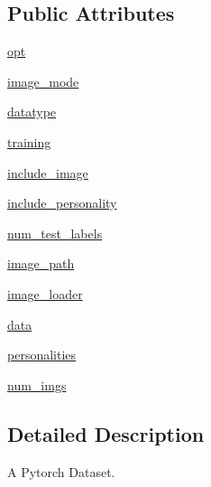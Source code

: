 \subsection*{Public Attributes}
\begin{DoxyCompactItemize}
\item 
\hyperlink{classparlai_1_1tasks_1_1personality__captions_1_1agents_1_1DefaultDataset_abe6bd53066bf10f26ef80157335cd6b9}{opt}
\item 
\hyperlink{classparlai_1_1tasks_1_1personality__captions_1_1agents_1_1DefaultDataset_a949e2d3987a90701c9280fd8f8b7b377}{image\+\_\+mode}
\item 
\hyperlink{classparlai_1_1tasks_1_1personality__captions_1_1agents_1_1DefaultDataset_a6463726aaf7a9bd790e11f049f0e7459}{datatype}
\item 
\hyperlink{classparlai_1_1tasks_1_1personality__captions_1_1agents_1_1DefaultDataset_a859342ffaf7f760cda952bc662cd7da3}{training}
\item 
\hyperlink{classparlai_1_1tasks_1_1personality__captions_1_1agents_1_1DefaultDataset_a14602789e47c31f02e86779207c539ed}{include\+\_\+image}
\item 
\hyperlink{classparlai_1_1tasks_1_1personality__captions_1_1agents_1_1DefaultDataset_a7224aca680b70755ada4619c5e769e3e}{include\+\_\+personality}
\item 
\hyperlink{classparlai_1_1tasks_1_1personality__captions_1_1agents_1_1DefaultDataset_a704ea7215d132aa1eaa5e058c95215e7}{num\+\_\+test\+\_\+labels}
\item 
\hyperlink{classparlai_1_1tasks_1_1personality__captions_1_1agents_1_1DefaultDataset_a73b3feee08eff4ccd268b348080bc9f4}{image\+\_\+path}
\item 
\hyperlink{classparlai_1_1tasks_1_1personality__captions_1_1agents_1_1DefaultDataset_ae8aa6d7d5869a14df29403626d053b0f}{image\+\_\+loader}
\item 
\hyperlink{classparlai_1_1tasks_1_1personality__captions_1_1agents_1_1DefaultDataset_a52ccf1dae943d045a66a7bcc66804638}{data}
\item 
\hyperlink{classparlai_1_1tasks_1_1personality__captions_1_1agents_1_1DefaultDataset_ab50f9303d20d862328f4961fc20e0428}{personalities}
\item 
\hyperlink{classparlai_1_1tasks_1_1personality__captions_1_1agents_1_1DefaultDataset_aa3268ee6597893589b2142645be2ad2c}{num\+\_\+imgs}
\end{DoxyCompactItemize}


\subsection{Detailed Description}
\begin{DoxyVerb}A Pytorch Dataset.
\end{DoxyVerb}
 

